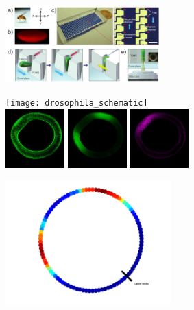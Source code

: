 \documentclass[10pt]{article}
\begin{document}
\begin{figure}[!ht]
\begin{center}
\begin{subfigure}{\textwidth}
\centering
\includegraphics[width=0.65\textwidth]{drosophila_imaging_setup}
\caption{}
\label{subfig:imaging_device}
\end{subfigure}
\begin{subfigure}{0.55\textwidth}
\texttt{[image: drosophila\_schematic]}\\
\includegraphics[width=0.25\textwidth]{drosophila_membrane}
\hfill
\includegraphics[width=0.25\textwidth]{drosophila_dpERK}
\hfill
\includegraphics[width=0.25\textwidth]{drosophila_DI}
\caption{}
\end{subfigure}
\begin{subfigure}{0.35\textwidth}
\centering
\includegraphics[width=0.7\textwidth]{circle_profile}\\

\end{subfigure}
\end{center}
\end{figure}
\end{document}
